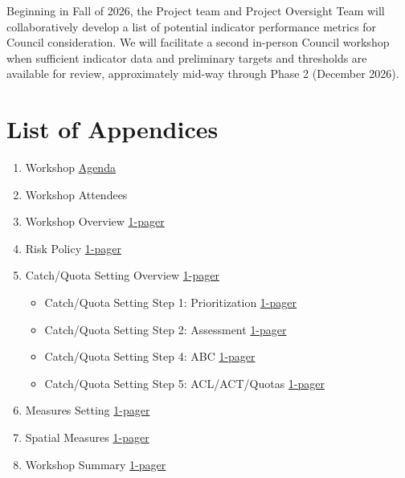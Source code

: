 \documentclass[
]{article}
\providecommand{\tightlist}{%
  \setlength{\itemsep}{0pt}\setlength{\parskip}{0pt}}
\begin{document}
Beginning in Fall of 2026, the Project team and Project Oversight Team will collaboratively develop a list of potential indicator performance metrics for Council consideration. We will facilitate a second in-person Council workshop when sufficient indicator data and preliminary targets and thresholds are available for review, approximately mid-way through Phase 2 (December 2026).

\section{List of Appendices}\label{list-of-appendices}

\begin{enumerate}
\def\labelenumi{\arabic{enumi}.}
\tightlist
\item
  Workshop \href{https://www.mafmc.org/s/1_Final-Mini-Workshop-Agenda.pdf}{Agenda}
\item
  Workshop Attendees
\item
  Workshop Overview \href{https://www.mafmc.org/s/2_MiniWK_Overview.pdf}{1-pager}
\item
  Risk Policy \href{https://www.mafmc.org/s/3_MiniWK_RiskPolicy.pdf}{1-pager}
\item
  Catch/Quota Setting Overview \href{https://www.mafmc.org/s/4_MiniWK_CatchQuotas.pdf}{1-pager}

  \begin{itemize}
  \tightlist
  \item
    Catch/Quota Setting Step 1: Prioritization \href{https://www.mafmc.org/s/4a_MiniWK_CatchQuotas_1_Prioritize.pdf}{1-pager}
  \item
    Catch/Quota Setting Step 2: Assessment \href{https://www.mafmc.org/s/4b_MiniWK_CatchQuotas_2_Assess.pdf}{1-pager}
  \item
    Catch/Quota Setting Step 4: ABC \href{https://www.mafmc.org/s/4c_MiniWK_CatchQuotas_4_ABC.pdf}{1-pager}
  \item
    Catch/Quota Setting Step 5: ACL/ACT/Quotas \href{https://www.mafmc.org/s/4d_MiniWK_CatchQuotas_5_ACLACTQuota.pdf}{1-pager}
  \end{itemize}
\item
  Measures Setting \href{https://www.mafmc.org/s/5_MiniWK_MeasuresSetting.pdf}{1-pager}
\item
  Spatial Measures \href{https://www.mafmc.org/s/6_MiniWK_SpatialMeasures.pdf}{1-pager}
\item
  Workshop Summary \href{}{1-pager}
\end{enumerate}
\end{document}

